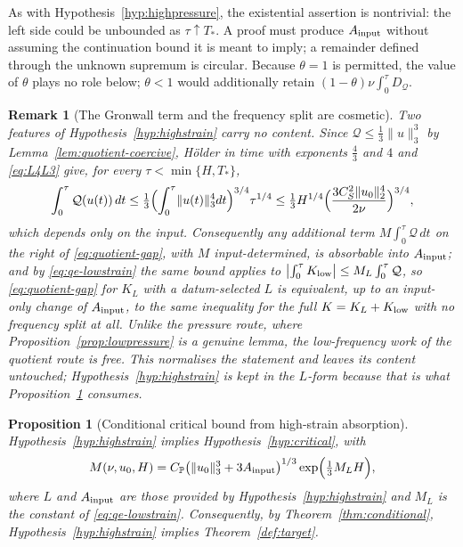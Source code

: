 \documentclass[11pt]{article}
\newtheorem{proposition}[theorem]{Proposition}
\newtheorem{remark}[theorem]{Remark}
\theoremstyle{definition}
\theoremstyle{plain}
\newcommand{\norm}[1]{\lVert #1\rVert}
\begin{document}
As with Hypothesis~\ref{hyp:highpressure}, the existential assertion is
nontrivial: the left side could be unbounded as $\tau\uparrow T_*$.  A proof
must produce $A_{\rm input}$ without assuming the continuation bound it is
meant to imply; a remainder defined through the unknown supremum is
circular.  Because $\theta=1$ is permitted, the value of $\theta$ plays no
role below; $\theta<1$ would additionally retain
$(1-\theta)\nu\int_0^\tau D_{\mathcal Q}$.

\begin{remark}[The Gronwall term and the frequency split are cosmetic]
\label{rem:highstrain-normalisation}
Two features of Hypothesis~\ref{hyp:highstrain} carry no content.  Since
$\mathcal Q\leq\frac13\norm u_3^3$ by Lemma~\ref{lem:quotient-coercive},
H\"older in time with exponents $\frac43$ and $4$ and \eqref{eq:L4L3} give,
for every $\tau<\min\{H,T_*\}$,
\[
 \int_0^\tau\mathcal Q(u(t))\,dt
 \leq\tfrac13\Bigl(\int_0^\tau\norm{u(t)}_3^4dt\Bigr)^{3/4}\tau^{1/4}
 \leq\tfrac13H^{1/4}\Bigl(\frac{3C_S^2\norm{u_0}_2^4}{2\nu}\Bigr)^{3/4},
\]
which depends only on the input.  Consequently any additional term
$M\int_0^\tau\mathcal Q\,dt$ on the right of \eqref{eq:quotient-gap}, with $M$
input-determined, is absorbable into $A_{\rm input}$; and by
\eqref{eq:qe-lowstrain} the same bound applies to
$\bigl|\int_0^\tau K_{\rm low}\bigr|\leq M_L\int_0^\tau\mathcal Q$, so
\eqref{eq:quotient-gap} for $K_L$ with a datum-selected $L$ is equivalent, up
to an input-only change of $A_{\rm input}$, to the same inequality for the
full $K=K_L+K_{\rm low}$ with no frequency split at all.  Unlike the pressure
route, where Proposition~\ref{prop:lowpressure} is a genuine lemma, the
low-frequency work of the quotient route is free.  This normalises the
statement and leaves its content untouched; Hypothesis~\ref{hyp:highstrain}
is kept in the $L$-form because that is what
Proposition~\ref{prop:quotient-conditional} consumes.
\end{remark}

\begin{proposition}[Conditional critical bound from high-strain absorption]
\label{prop:quotient-conditional}
Hypothesis~\ref{hyp:highstrain} implies Hypothesis~\ref{hyp:critical}, with
\begin{equation}\label{eq:qe-M}
 M(\nu,u_0,H)
 =C_{\mathbb P}\bigl(\norm{u_0}_3^3+3A_{\rm input}\bigr)^{1/3}
 \exp\Bigl(\tfrac13M_LH\Bigr),
\end{equation}
where $L$ and $A_{\rm input}$ are those provided by
Hypothesis~\ref{hyp:highstrain} and $M_L$ is the constant of
\eqref{eq:qe-lowstrain}.  Consequently, by Theorem~\ref{thm:conditional},
Hypothesis~\ref{hyp:highstrain} implies Theorem~\ref{def:target}.
\end{proposition}
\end{document}
